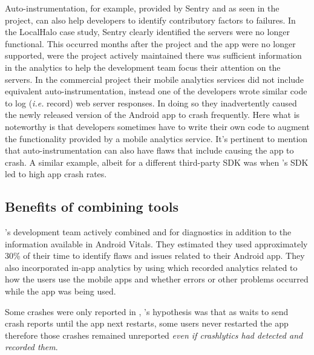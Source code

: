 Auto-instrumentation, for example, provided by Sentry and as seen in the  project, can also help developers to identify contributory factors to failures. In the LocalHalo case study, Sentry clearly identified the servers were no longer functional. This occurred months after the project and the app were no longer supported, were the project actively maintained there was sufficient information in the analytics to help the development team focus their attention on the servers. In the commercial project their mobile analytics services did not include equivalent auto-instrumentation, instead one of the developers wrote similar code to log (\emph{i.e.} record) web server responses. In doing so they inadvertently caused the newly released version of the Android app to crash frequently. Here what is noteworthy is that developers sometimes have to write their own code to augment the functionality provided by a mobile analytics service. It's pertinent to mention that auto-instrumentation can also have flaws that include causing the app to crash. A similar example, albeit for a different third-party SDK was when 's SDK led to high app crash rates.

\subsection{Benefits of combining tools}
    
's development team actively combined  and  for diagnostics in addition to the information available in Android Vitals. They estimated they used  approximately 30\% of their time to identify flaws and issues related to their Android app.
%
They also incorporated in-app analytics by using  which recorded analytics related to how the users use the mobile apps and whether errors or other problems occurred while the app was being used. 

Some crashes were only reported in , 's hypothesis was that as  waits to send crash reports until the app next restarts, some users never restarted the app therefore those crashes remained unreported \emph{even if crashlytics had detected and recorded them}.

